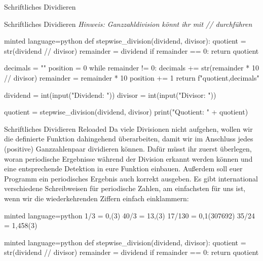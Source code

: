 \begin{task}[points=auto]{Schriftliches Dividieren}
\begin{subtask*}[points=0]{Schriftliches Dividieren }
        \textit{Hinweis: Ganzzahldivision könnt ihr mit // durchführen}

        \begin{solution}
            \begin{codeBlock}[]{minted language=python}
                def stepwise_division(dividend, divisor):
                quotient = str(dividend // divisor)
                remainder = dividend %
                if remainder == 0:
                    return quotient

                decimals = ""
                position = 0
                while remainder != 0:
                    decimals += str(remainder * 10 // divisor)
                    remainder = remainder * 10 %
                    position += 1
                return f"{quotient},{decimals}"


            dividend = int(input("Dividend: "))
            divisor = int(input("Divisor: "))

            quotient = stepwise_division(dividend, divisor)
            print("Quotient: " + quotient)
            \end{codeBlock}
        \end{solution}
    \end{subtask*}
    \begin{subtask*}[points=0]{Schriftliches Dividieren Reloaded }
        Da viele Divisionen nicht aufgehen, wollen wir die definierte Funktion dahingehend überarbeiten, damit wir im Anschluss jedes (positive) Ganzzahlenpaar dividieren können. Dafür müsst ihr zuerst überlegen, woran periodische Ergebnisse während der Division erkannt werden können und eine entsprechende Detektion in eure Funktion einbauen. Außerdem soll euer Programm ein periodisches Ergebnis auch korrekt ausgeben. Es gibt international verschiedene Schreibweisen für periodische Zahlen, am einfachsten für uns ist, wenn wir die wiederkehrenden Ziffern einfach einklammern:
        \begin{codeBlock}[]{minted language=python}
            1/3 = 0,(3)
            40/3 = 13,(3)
            17/130 = 0,1(307692)
            35/24 = 1,458(3)
        \end{codeBlock}

        \begin{solution}
            \begin{codeBlock}[]{minted language=python}
                def stepwise_division(dividend, divisor):
                    quotient = str(dividend // divisor)
                    remainder = dividend %
                    if remainder == 0:
                        return quotient


\end{codeBlock}
\end{solution}
\end{subtask*}
\end{task}
